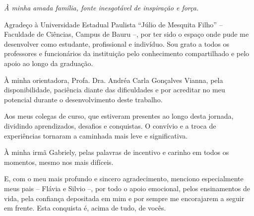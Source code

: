 \documentclass[
	12pt,				%
	openright,			%
	oneside,			%
	a4paper,			%
	english,			%
	french,				%
	spanish,			%
	brazil,				%
	]{lib/abntex2}
\begin{document}
\begin{dedicatoria}
	\vspace*{\fill}
	\begin{flushright}
        \textit{À minha amada família, fonte inesgotável de inspiração e força.} 
	\end{flushright}
\end{dedicatoria}

\begin{agradecimentos}
    Agradeço à Universidade Estadual Paulista ``Júlio de Mesquita Filho'' -- Faculdade de Ciências, Campus de Bauru --,
    por ter sido o espaço onde pude me desenvolver como estudante, profissional e indivíduo. Sou grato a todos os
    professores e funcionários da instituição pelo conhecimento compartilhado e pelo apoio ao longo da graduação.
    
    À minha orientadora, Profa. Dra. Andréa Carla Gonçalves Vianna, pela disponibilidade, paciência diante das dificuldades 
    e por acreditar no meu potencial durante o desenvolvimento deste trabalho.

    Aos meus colegas de curso, que estiveram presentes ao longo desta jornada, dividindo aprendizados,
    desafios e conquistas. O convívio e a troca de experiências tornaram a caminhada mais leve e significativa.

    À minha irmã Gabriely, pelas palavras de incentivo e carinho em todos os momentos, mesmo nos mais difíceis.

    E, com o meu mais profundo e sincero agradecimento, menciono especialmente meus pais -- Flávia e Silvio
    --, por todo o apoio emocional, pelos ensinamentos de vida, pela confiança depositada em mim e por sempre me encorajarem a seguir em frente.
    Esta conquista é, acima de tudo, de vocês.
\end{agradecimentos}

\end{document}
